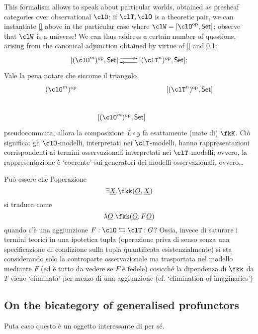 \documentclass[a4paper]{../birkjour}
\begin{document}
This formalism allows to speak about particular worlds, obtained as presheaf categories over observational $\clO$; if $\clT, \clO$ is a theoretic pair, we can instantiate \autoref{} above in the particular case where $\clW = [\clO^\op, \Set]$; observe that $\clW$ is a universe! We can thus address a certain number of questions, arising from the canonical adjunction obtained by virtue of \autoref{} and \ref{}:
\[
  \xymatrix{ [(\clO^m)^\op, \Set] \ar@<3pt>[r] & \ar@<3pt>[l] [(\clT^n)^\op, \Set];}
\]
Vale la pena notare che siccome il triangolo
\[
\vcenter{\xymatrix{
  (\clO^m)^\op && [(\clT^n)^\op, \Set] \\
  & [(\clO^m)^\op, \Set]
}}
\]
pseudocommuta, allora la composizione $L\circ y$ fa esattamente (mate di) $\fkK$. Ciò significa: gli $\clO$-modelli, interpretati nei $\clT$-modelli, hanno rappresentazioni corrispondenti ai termini osservazionali interpretati nei $\clT$-modelli; ovvero, la rappresentazione è `coerente' sui generatori dei modelli osservazionali, ovvero\dots

Può essere che l'operazione 
\[\exists \underline X . \fkk(\underline O, \underline X)\]
si traduca come 
\[\lambda \underline O.\fkk(\underline O, F\underline O)\]
quando c'è una aggiunzione $F : \clO \leftrightarrows \clT : G$? Ossia, invece di saturare i termini teorici in una ipotetica tupla (operazione priva di senso senza una specificazione di condizione sulla tupla quantificata esistenzialmente) si sta considerando solo la controparte osservazionale ma trasportata nel modello mediante $F$ (ed è tutto da vedere se $F$ è fedele) cosicché la dipendenza di $\fkk$ da $T$ viene `eliminata' per mezzo di una aggiunzione (cf. `elimination of imaginaries')
\subsection{On the bicategory of generalised profunctors}
Puta caso questo è un oggetto interessante di per sé.
\end{document}

